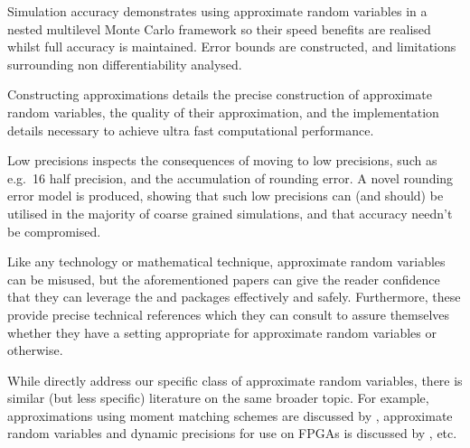 \begin{longdescription}
	\item[Simulation accuracy] \citep{giles2022approximate} demonstrates using approximate random variables in a nested multilevel Monte Carlo framework so their speed benefits are realised whilst full accuracy is maintained. Error bounds are constructed, and limitations surrounding non differentiability analysed. 
	
	\item[Constructing approximations] \citep{giles2023approximating} details the precise construction of approximate random variables, the quality of their approximation, and the implementation details necessary to achieve ultra fast computational performance.
	
	\item[Low precisions] \citep{giles2024rounding} inspects the consequences of moving to low precisions, such as e.g.\ \qty{16}{\bit} half precision, and the accumulation of rounding error. A novel rounding error model is produced, showing that such low precisions can (and should) be utilised in the majority of coarse grained simulations, and that accuracy needn't be compromised. 
\end{longdescription}

Like any technology or mathematical technique, approximate random variables can be misused, but the aforementioned papers can give the reader confidence that they can leverage the \arv and \pyarv packages effectively and safely. Furthermore, these provide precise technical references which they can consult to assure themselves whether they have a setting appropriate for approximate random variables or otherwise. 

While \citep{giles2022approximate,giles2023approximating,giles2024rounding} directly address our specific class of approximate random variables, there is similar (but less specific) literature on the same broader topic. For example, approximations using moment matching schemes are discussed by \citet{muller2015improving}, approximate random variables and dynamic precisions for use on FPGAs is discussed by \citet{haas2025monte}, etc. 
